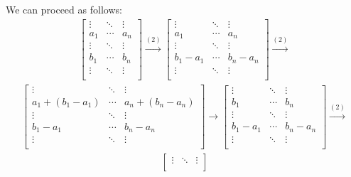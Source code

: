 \documentclass[12pt]{article}
\begin{document}
\begin{enumerate}
      We can proceed as follows:
      \begin{align*}
        \begin{bmatrix}
          \vdots   & \ddots & \vdots\\
          a_1 & \cdots & a_n\\
          \vdots   & \ddots & \vdots\\
          b_1 & \cdots & b_n\\
          \vdots   & \ddots & \vdots\\
        \end{bmatrix}
        \xrightarrow{(2)}
        \begin{bmatrix}
          \vdots   & \ddots & \vdots\\
          a_1 & \cdots & a_n\\
          \vdots   & \ddots & \vdots\\
          b_1 - a_1 & \cdots & b_n - a_n\\
          \vdots   & \ddots & \vdots\\
        \end{bmatrix}
        \xrightarrow{(2)}
      \end{align*}
      \begin{align*}
        \begin{bmatrix}
          \vdots   & \ddots & \vdots\\
          a_1 + (b_1 - a_1) & \cdots & a_n + (b_n - a_n)\\
          \vdots   & \ddots & \vdots\\
          b_1 - a_1 & \cdots & b_n - a_n\\
          \vdots   & \ddots & \vdots\\
        \end{bmatrix}
        \xrightarrow{}
        \begin{bmatrix}
          \vdots   & \ddots & \vdots\\
          b_1 & \cdots & b_n \\
          \vdots   & \ddots & \vdots\\
          b_1 - a_1 & \cdots & b_n - a_n\\
          \vdots   & \ddots & \vdots\\
        \end{bmatrix}
        \xrightarrow{(2)}
      \end{align*}
      \begin{align*}
        \begin{bmatrix}
          \vdots   & \ddots & \vdots\\

\end{bmatrix}
\end{align*}
\end{enumerate}
\end{document}
